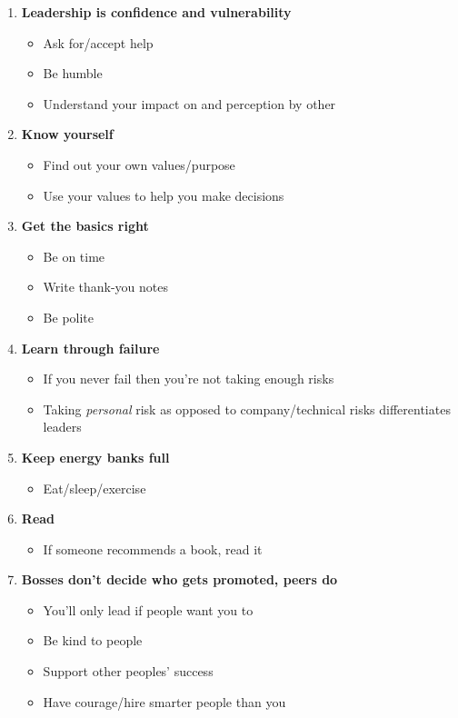 \documentclass{article}
\begin{document}
\begin{enumerate}
\item \textbf{Leadership is confidence and vulnerability} \begin{itemize}
\item Ask for/accept help
\item Be humble
\item Understand your impact on and perception by other
\end{itemize}
\item \textbf{Know yourself} \begin{itemize}
\item Find out your own values/purpose
\item Use your values to help you make decisions
\end{itemize}
\item \textbf{Get the basics right} \begin{itemize}
\item Be on time
\item Write thank-you notes
\item Be polite
\end{itemize}
\item \textbf{Learn through failure} \begin{itemize}
\item If you never fail then you're not taking enough risks
\item Taking \textit{personal} risk as opposed to company/technical risks differentiates leaders
\end{itemize}
\item \textbf{Keep energy banks full} \begin{itemize}
\item Eat/sleep/exercise
\end{itemize}
\item \textbf{Read} \begin{itemize}
\item If someone recommends a book, read it
\end{itemize}
\item \textbf{Bosses don't decide who gets promoted, peers do} \begin{itemize}
\item You'll only lead if people want you to
\item Be kind to people 
\item Support other peoples' success
\item Have courage/hire smarter people than you

\end{itemize}
\end{enumerate}
\end{document}
